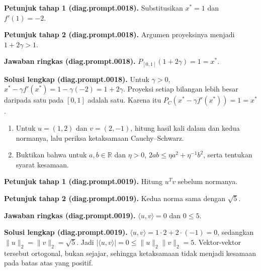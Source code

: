 \par\noindent\textbf{Petunjuk tahap 1 (diag.prompt.0018).}
Substitusikan $x^*=1$ dan $f'(1)=-2$.
\label{orig03:diag:hint1:0018}
\par\noindent\textbf{Petunjuk tahap 2 (diag.prompt.0018).}
Argumen proyeksinya menjadi $1+2\gamma>1$.
\label{orig03:diag:hint2:0018}
\par\noindent\textbf{Jawaban ringkas (diag.prompt.0018).}
$P_{[0,1]}(1+2\gamma)=1=x^*$.
\label{orig03:diag:answer:0018}
\par\noindent\textbf{Solusi lengkap (diag.prompt.0018).}
Untuk $\gamma>0$,
$x^*-\gamma f'(x^*)=1-\gamma(-2)=1+2\gamma$. Proyeksi setiap bilangan lebih
besar daripada satu pada $[0,1]$ adalah satu. Karena itu
$P_C(x^*-\gamma f'(x^*))=1=x^*$.
\label{orig03:diag:solution:0018}

\begin{exercise}
\label{orig03:diag:problem:0010}
\begin{enumerate}
\item\label{orig03:diag:prompt:0019}
Untuk $u=(1,2)$ dan $v=(2,-1)$, hitung hasil kali dalam dan kedua normanya,
lalu periksa ketaksamaan Cauchy--Schwarz.
\item\label{orig03:diag:prompt:0020}
Buktikan bahwa untuk $a,b\in\mathbb{R}$ dan $\eta>0$,
$2ab\leq\eta a^2+\eta^{-1}b^2$, serta tentukan syarat kesamaan.
\end{enumerate}
\end{exercise}

\par\noindent\textbf{Petunjuk tahap 1 (diag.prompt.0019).}
Hitung $u^Tv$ sebelum normanya.
\label{orig03:diag:hint1:0019}
\par\noindent\textbf{Petunjuk tahap 2 (diag.prompt.0019).}
Kedua norma sama dengan $\sqrt5$.
\label{orig03:diag:hint2:0019}
\par\noindent\textbf{Jawaban ringkas (diag.prompt.0019).}
$\langle u,v\rangle=0$ dan $0\leq5$.
\label{orig03:diag:answer:0019}
\par\noindent\textbf{Solusi lengkap (diag.prompt.0019).}
$\langle u,v\rangle=1\cdot2+2\cdot(-1)=0$, sedangkan
$\lVert u\rVert_2=\lVert v\rVert_2=\sqrt5$. Jadi
$|\langle u,v\rangle|=0\leq\lVert u\rVert_2\lVert v\rVert_2=5$.
Vektor-vektor tersebut ortogonal, bukan sejajar, sehingga ketaksamaan tidak
menjadi kesamaan pada batas atas yang positif.
\label{orig03:diag:solution:0019}

